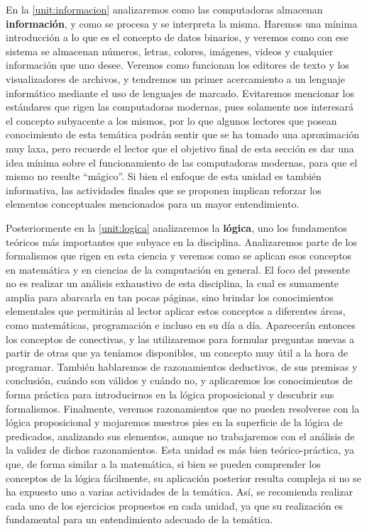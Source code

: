 En la \autoref{unit:informacion} analizaremos como las computadoras almacenan
\textbf{información}, y como se procesa y se interpreta la misma. Haremos una
mínima introducción a lo que es el concepto de datos binarios, y veremos como
con ese sistema se almacenan números, letras, colores, imágenes, videos y
cualquier información que uno desee. Veremos como funcionan los editores de
texto y los visualizadores de archivos, y tendremos un primer acercamiento a un
lenguaje informático mediante el uso de lenguajes de marcado. Evitaremos
mencionar los estándares que rigen las computadoras modernas, pues solamente nos
interesará el concepto subyacente a los mismos, por lo que algunos lectores que
posean conocimiento de esta temática podrán sentir que se ha tomado una
aproximación muy laxa, pero recuerde el lector que el objetivo final de esta
sección es dar una idea mínima sobre el funcionamiento de las computadoras
modernas, para que el mismo no resulte ``mágico''. Si bien el enfoque de esta
unidad es también informativa, las actividades finales que se proponen implican
reforzar los elementos conceptuales mencionados para un mayor entendimiento.

Posteriormente en la \autoref{unit:logica} analizaremos la \textbf{lógica}, uno
los fundamentos teóricos más importantes que subyace en la disciplina.
Analizaremos parte de los formalismos que rigen en esta ciencia y veremos como
se aplican esos conceptos en matemática y en ciencias de la computación en
general. El foco del presente no es realizar un análisis exhaustivo de esta
disciplina, la cual es sumamente amplia para abarcarla en tan pocas páginas,
sino brindar los conocimientos elementales que permitirán al lector aplicar
estos conceptos a diferentes áreas, como matemáticas, programación e incluso en
su día a día. Aparecerán entonces los conceptos de conectivas, y las
utilizaremos para formular preguntas nuevas a partir de otras que ya teníamos
disponibles, un concepto muy útil a la hora de programar. También hablaremos de
razonamientos deductivos, de sus premisas y conclusión, cuándo son válidos y
cuándo no, y aplicaremos los conocimientos de forma práctica para introducirnos
en la lógica proposicional y descubrir sus formalismos. Finalmente, veremos
razonamientos que no pueden resolverse con la lógica proposicional y mojaremos
nuestros pies en la superficie de la lógica de predicados, analizando sus
elementos, aunque no trabajaremos con el análisis de la validez de dichos
razonamientos. Esta unidad es más bien teórico-práctica, ya que, de forma
similar a la matemática, si bien se pueden comprender los conceptos de la lógica
fácilmente, su aplicación posterior resulta compleja si no se ha expuesto uno a
varias actividades de la temática. Así, se recomienda realizar cada uno de los
ejercicios propuestos en cada unidad, ya que su realización es fundamental para
un entendimiento adecuado de la temática.

